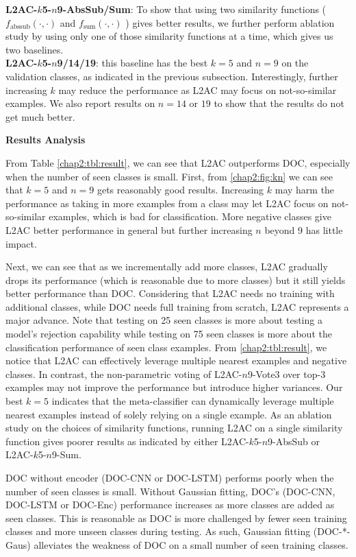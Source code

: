 \textbf{L2AC-$k$5-$n$9-AbsSub/Sum}: To show that using two similarity functions ($f_\text{abssub}(\cdot, \cdot)$ and $f_\text{sum}(\cdot, \cdot)$ ) gives better results, we further perform ablation study by using only one of those similarity functions at a time, which gives us two baselines.\\
\textbf{L2AC-$k$5-$n$9/14/19}: this baseline has the best $k=5$ and $n=9$ on the validation classes, as indicated in the previous subsection. Interestingly, further increasing $k$ may reduce the performance as L2AC may focus on not-so-similar examples. We also report results on $n=14$ or $19$ to show that the results do not get much better. 

\textbf{Results Analysis}

From Table \ref{chap2:tbl:result}, we can see that L2AC outperforms DOC, especially when the number of seen classes is small. 
First, from \ref{chap2:fig:kn} we can see that $k=5$ and $n=9$ gets reasonably good results.
Increasing $k$ may harm the performance as taking in more examples from a class may let L2AC focus on not-so-similar examples, which is bad for classification. More negative classes give L2AC better performance in general but further increasing $n$ beyond 9 has little impact.

Next, we can see that as we incrementally add more classes, L2AC gradually drops its performance (which is reasonable due to more classes) but it still yields better performance than DOC. Considering that L2AC needs no training with additional classes, while DOC needs full training from scratch, L2AC  represents a major advance. Note that testing on 25 seen classes is more about testing a model's rejection capability while testing on 75 seen classes is more about the classification performance of seen class examples.
From \ref{chap2:tbl:result}, we notice that L2AC can effectively leverage multiple nearest examples and negative classes.
In contrast, the non-parametric voting of L2AC-$n$9-Vote3 over top-3 examples may not improve the performance but introduce higher variances.
Our best $k=5$ indicates that the meta-classifier can dynamically leverage multiple nearest examples instead of solely relying on a single example.
As an ablation study on the choices of similarity functions, running L2AC on a single similarity function gives poorer results as indicated by either L2AC-$k$5-$n$9-AbsSub or L2AC-$k$5-$n$9-Sum.

DOC without encoder (DOC-CNN or DOC-LSTM) performs poorly when the number of seen classes is small.
Without Gaussian fitting, DOC's (DOC-CNN, DOC-LSTM or DOC-Enc) performance increases as more classes are added as seen classes. This is reasonable as DOC is more challenged by fewer seen training classes and more unseen classes during testing. 
As such, Gaussian fitting (DOC-*-Gaus) alleviates the weakness of DOC on a small number of seen training classes.

